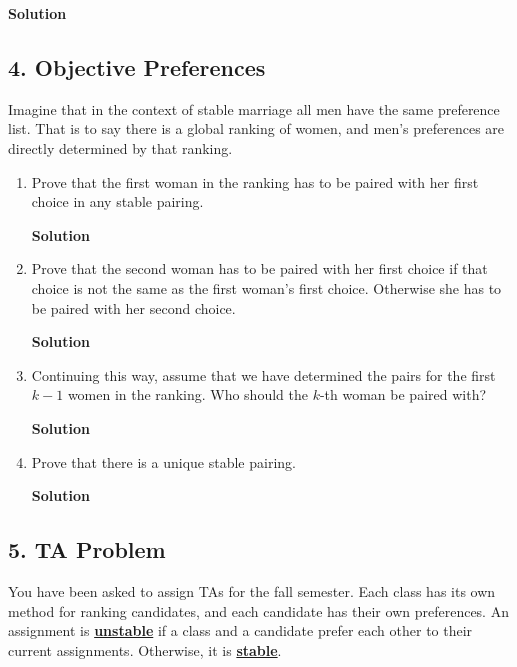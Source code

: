 \documentclass{article}
\begin{document}
\vspace{1mm}
\begin{mdframed}
\textbf{Solution}

\end{mdframed}

\clearpage

\subsection*{4. Objective Preferences}
Imagine that in the context of stable marriage all men have the same preference list. That is to say there is a global ranking of women, and men's preferences are directly determined by that ranking.
\begin{enumerate}
\item Prove that the first woman in the ranking has to be paired with her first choice in any stable pairing.
\begin{mdframed}
\textbf{Solution}

\end{mdframed}
\item Prove that the second woman has to be paired with her first choice if that choice is not the same as the first woman's first choice. Otherwise she has to be paired with her second choice.
\begin{mdframed}
\textbf{Solution}

\end{mdframed}
\item Continuing this way, assume that we have determined the pairs for the first $k -1$ women in the
ranking. Who should the $k$-th woman be paired with?
\begin{mdframed}
\textbf{Solution}

\end{mdframed}
\item Prove that there is a unique stable pairing.
\begin{mdframed}
\textbf{Solution}

\end{mdframed}
\end{enumerate}


\clearpage

\subsection*{5. TA Problem}
You have been asked to assign TAs for the fall semester. Each class has its own method for ranking candidates, and each candidate has their own preferences. An assignment is \textbf{\underline{unstable}} if a class and a candidate prefer each other to their current assignments. Otherwise, it is \textbf{\underline{stable}}.
\end{document}

